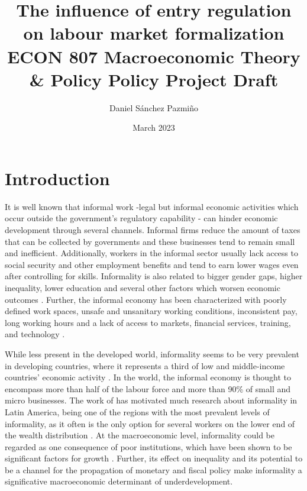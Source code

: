 \documentclass[12pt,a4paper]{article}\usepackage[]{graphicx}\usepackage[]{xcolor}
\title{The influence of entry regulation on labour market formalization \\[1em] 
\large{ECON 807 Macroeconomic Theory \& Policy Policy Project Draft}}
\author{Daniel Sánchez Pazmiño}
\date{March 2023}
\begin{document}
\maketitle

\begin{abstract}

\lipsum[1]

\end{abstract}

\section{Introduction}

It is well known that informal work -legal but informal economic activities which occur outside the government's regulatory capability \parencite{Sassen.1994} - can hinder economic development through several channels. Informal firms reduce the amount of taxes that can be collected by governments and these businesses tend to remain small and inefficient. Additionally, workers in the informal sector usually lack access to social security and other employment benefits and tend to earn lower wages even after controlling for skills. Informality is also related to bigger gender gaps, higher inequality, lower education and several other factors which worsen economic outcomes \parencite{Delechat2020}. Further, the informal economy has been characterized with poorly defined work spaces, unsafe and unsanitary working conditions, inconsistent pay, long working hours and a lack of access to markets, financial services, training, and technology \parencite{IloND}. 

While less present in the developed world, informality seems to be very prevalent in developing countries, where it represents a third of low and middle-income countries' economic activity \parencite{Delechat2020}. In the world, the informal economy is thought to encompass more than half of the labour force and more than 90\% of small and micro businesses. The work of \textcite{Soto.2002} has motivated much research about informality in Latin America, being one of the regions with the most prevalent levels of informality, as it often is the only option for several workers on the lower end of the wealth distribution \parencite{Oviedo.2009}. At the macroeconomic level, informality could be regarded as one consequence of poor institutions, which have been shown to be significant factors for growth \parencite{Acemoglu.2001, RafaelLaPorta.1997, Glaeser.2004}. Further, its effect on inequality and its potential to be a channel for the propagation of monetary and fiscal policy \textcite{Alberola.2020} make informality a significative macroeconomic determinant of underdevelopment.
\end{document}
